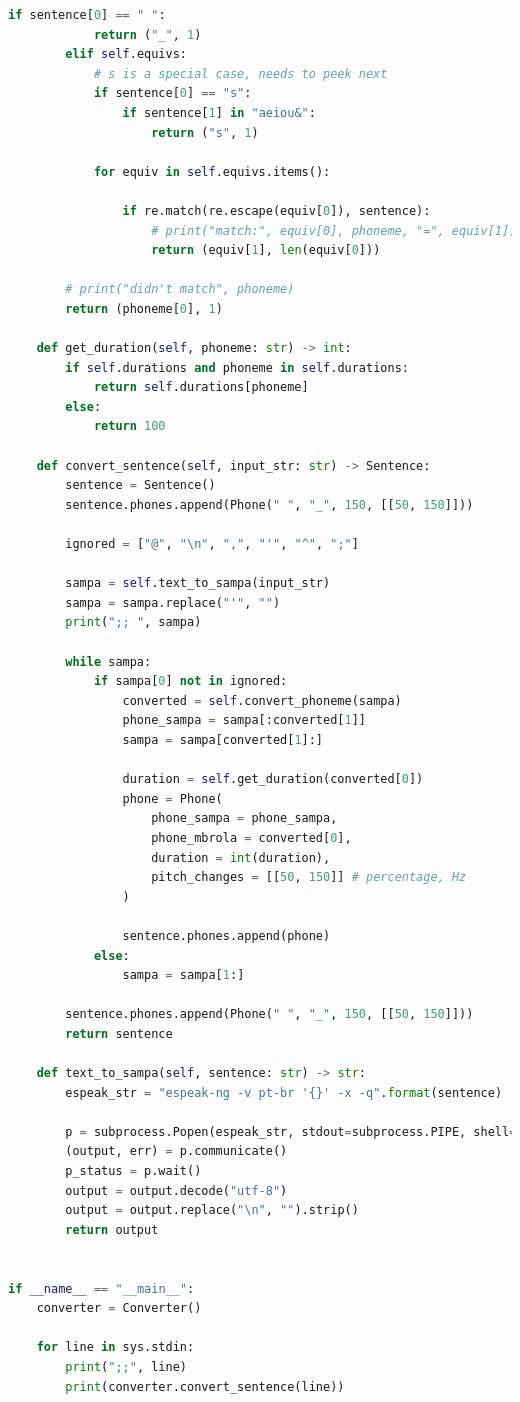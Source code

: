 \begin{lstlisting}[caption=Conversor eSpeakNG-MBROLA, label=conversao, language=Python]
        if sentence[0] == " ":
            return ("_", 1)
        elif self.equivs:
            # s is a special case, needs to peek next
            if sentence[0] == "s":
                if sentence[1] in "aeiou&":
                    return ("s", 1)

            for equiv in self.equivs.items():

                if re.match(re.escape(equiv[0]), sentence):
                    # print("match:", equiv[0], phoneme, "=", equiv[1])
                    return (equiv[1], len(equiv[0]))

        # print("didn't match", phoneme)
        return (phoneme[0], 1)

    def get_duration(self, phoneme: str) -> int:
        if self.durations and phoneme in self.durations:
            return self.durations[phoneme]
        else:
            return 100

    def convert_sentence(self, input_str: str) -> Sentence:
        sentence = Sentence()
        sentence.phones.append(Phone(" ", "_", 150, [[50, 150]]))

        ignored = ["@", "\n", ",", "'", "^", ";"]

        sampa = self.text_to_sampa(input_str)
        sampa = sampa.replace("'", "")
        print(";; ", sampa)

        while sampa:
            if sampa[0] not in ignored:
                converted = self.convert_phoneme(sampa)
                phone_sampa = sampa[:converted[1]]
                sampa = sampa[converted[1]:]

                duration = self.get_duration(converted[0])
                phone = Phone(
                    phone_sampa = phone_sampa,
                    phone_mbrola = converted[0],
                    duration = int(duration),
                    pitch_changes = [[50, 150]] # percentage, Hz
                )

                sentence.phones.append(phone)
            else:
                sampa = sampa[1:]

        sentence.phones.append(Phone(" ", "_", 150, [[50, 150]]))
        return sentence

    def text_to_sampa(self, sentence: str) -> str:
        espeak_str = "espeak-ng -v pt-br '{}' -x -q".format(sentence)

        p = subprocess.Popen(espeak_str, stdout=subprocess.PIPE, shell=True)
        (output, err) = p.communicate()
        p_status = p.wait()
        output = output.decode("utf-8")
        output = output.replace("\n", "").strip()
        return output


if __name__ == "__main__":
    converter = Converter()

    for line in sys.stdin:
        print(";;", line)
        print(converter.convert_sentence(line))
\end{lstlisting}

